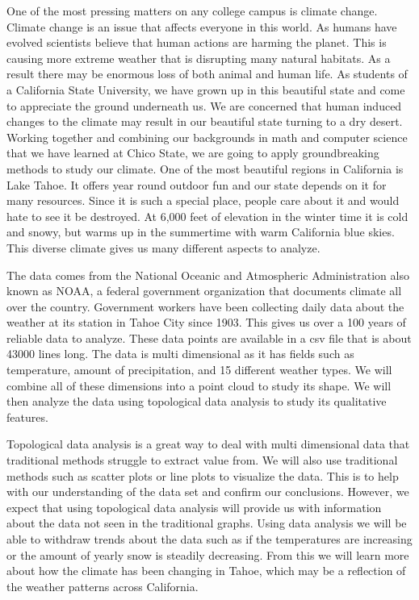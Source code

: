 \documentclass[12pt]{report}
\begin{document}
One of the most pressing matters on any college campus is climate change. Climate change is an issue that affects everyone in this world. As humans have evolved scientists believe that human actions are harming the planet. This is causing more extreme weather that is disrupting many natural habitats. As a result there may be enormous loss of both animal and human life. As students of a California State University, we have grown up in this beautiful state and come to appreciate the ground underneath us. We are concerned that human induced changes to the climate may result in our beautiful state turning to a dry desert. Working together and combining our backgrounds in math and computer science that we have learned at Chico State, we are going to apply groundbreaking methods to study our climate. One of the most beautiful regions in California is Lake Tahoe. It offers year round outdoor fun and our state depends on it for many resources. Since it is such a special place, people care about it and would hate to see it be destroyed. At 6,000 feet of elevation in the winter time it is cold and snowy, but warms up in the summertime with warm California blue skies. This diverse climate gives us many different aspects to analyze. 

The data comes from the National Oceanic and Atmospheric Administration also known as NOAA, a federal government organization that documents climate all over the country. Government workers have been collecting daily data about the weather at its station in Tahoe City since 1903. This gives us over a 100 years of reliable data to analyze. These data points are available in a csv file that is about 43000 lines long. The data is multi dimensional as it has fields such as temperature, amount of precipitation, and 15 different weather types. We will combine all of these dimensions into a point cloud to study its shape. We will then analyze the data using topological data analysis to study its qualitative features. 

Topological data analysis is a great way to deal with multi dimensional data that traditional methods struggle to extract value from. We will also use traditional methods such as scatter plots or line plots to visualize the data. This is to help with our understanding of the data set and confirm our conclusions. However, we expect that using topological data analysis will provide us with information about the data not seen in the traditional graphs. Using data analysis we will be able to withdraw trends about the data such as if the temperatures are increasing or the amount of yearly snow is steadily decreasing. From this we will learn more about how the climate has been changing in Tahoe, which may be a reflection of the weather patterns across California. 
\end{document}
